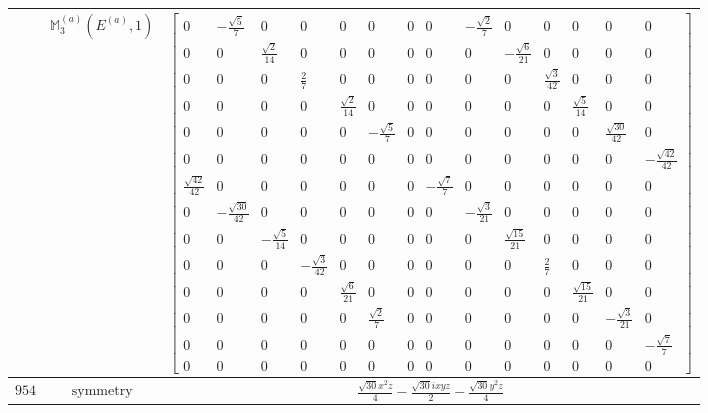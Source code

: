 \documentclass[fleqn,8pt,landscape]{jsarticle}
\begin{document}
\begin{longtable}{ccc}
$  $ & $ \mathbb{M}_{3}^{(a)}(E^{(a)},1) $ & $ \begin{bmatrix} 0 & - \frac{\sqrt{5}}{7} & 0 & 0 & 0 & 0 & 0 & 0 & - \frac{\sqrt{2}}{7} & 0 & 0 & 0 & 0 & 0 \\ 0 & 0 & \frac{\sqrt{2}}{14} & 0 & 0 & 0 & 0 & 0 & 0 & - \frac{\sqrt{6}}{21} & 0 & 0 & 0 & 0 \\ 0 & 0 & 0 & \frac{2}{7} & 0 & 0 & 0 & 0 & 0 & 0 & \frac{\sqrt{3}}{42} & 0 & 0 & 0 \\ 0 & 0 & 0 & 0 & \frac{\sqrt{2}}{14} & 0 & 0 & 0 & 0 & 0 & 0 & \frac{\sqrt{5}}{14} & 0 & 0 \\ 0 & 0 & 0 & 0 & 0 & - \frac{\sqrt{5}}{7} & 0 & 0 & 0 & 0 & 0 & 0 & \frac{\sqrt{30}}{42} & 0 \\ 0 & 0 & 0 & 0 & 0 & 0 & 0 & 0 & 0 & 0 & 0 & 0 & 0 & - \frac{\sqrt{42}}{42} \\ \frac{\sqrt{42}}{42} & 0 & 0 & 0 & 0 & 0 & 0 & - \frac{\sqrt{7}}{7} & 0 & 0 & 0 & 0 & 0 & 0 \\ 0 & - \frac{\sqrt{30}}{42} & 0 & 0 & 0 & 0 & 0 & 0 & - \frac{\sqrt{3}}{21} & 0 & 0 & 0 & 0 & 0 \\ 0 & 0 & - \frac{\sqrt{5}}{14} & 0 & 0 & 0 & 0 & 0 & 0 & \frac{\sqrt{15}}{21} & 0 & 0 & 0 & 0 \\ 0 & 0 & 0 & - \frac{\sqrt{3}}{42} & 0 & 0 & 0 & 0 & 0 & 0 & \frac{2}{7} & 0 & 0 & 0 \\ 0 & 0 & 0 & 0 & \frac{\sqrt{6}}{21} & 0 & 0 & 0 & 0 & 0 & 0 & \frac{\sqrt{15}}{21} & 0 & 0 \\ 0 & 0 & 0 & 0 & 0 & \frac{\sqrt{2}}{7} & 0 & 0 & 0 & 0 & 0 & 0 & - \frac{\sqrt{3}}{21} & 0 \\ 0 & 0 & 0 & 0 & 0 & 0 & 0 & 0 & 0 & 0 & 0 & 0 & 0 & - \frac{\sqrt{7}}{7} \\ 0 & 0 & 0 & 0 & 0 & 0 & 0 & 0 & 0 & 0 & 0 & 0 & 0 & 0 \end{bmatrix} $ \\ \hline
$ 954 $ & $ \text{symmetry} $ & $ \frac{\sqrt{30} x^{2} z}{4} - \frac{\sqrt{30} i x y z}{2} - \frac{\sqrt{30} y^{2} z}{4} $ \\

\end{longtable}
\end{document}
